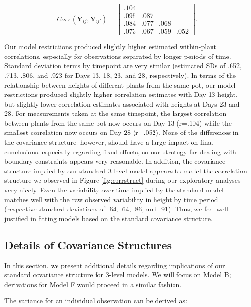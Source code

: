 \documentclass[
]{krantz}
\begin{document}
\[  Corr(\textbf{Y}_{ij},\textbf{Y}_{ij'}) = \left[
          \begin{array}{cccc}
            .104 & & & \\
            .095 & .087 & & \\
            .084 & .077 & .068 & \\
            .073 & .067 & .059 & .052
          \end{array} \right]. \]

Our model restrictions produced slightly higher estimated within-plant correlations, especially for observations separated by longer periods of time. Standard deviation terms by timepoint are very similar (estimated SDs of .652, .713, .806, and .923 for Days 13, 18, 23, and 28, respectively). In terms of the relationship between heights of different plants from the same pot, our model restrictions produced slightly higher correlation estimates with Day 13 height, but slightly lower correlation estimates associated with heights at Days 23 and 28. For measurements taken at the same timepoint, the largest correlation between plants from the same pot now occurs on Day 13 (r=.104) while the smallest correlation now occurs on Day 28 (r=.052). None of the differences in the covariance structure, however, should have a large impact on final conclusions, especially regarding fixed effects, so our strategy for dealing with boundary constraints appears very reasonable. In addition, the covariance structure implied by our standard 3-level model appears to model the correlation structure we observed in Figure \ref{fig:corrstruct} during our exploratory analyses very nicely. Even the variability over time implied by the standard model matches well with the raw observed variability in height by time period (respective standard deviations of .64, .64, .86, and .91). Thus, we feel well justified in fitting models based on the standard covariance structure.

\subsection{Details of Covariance Structures}\label{optionalerror}

In this section, we present additional details regarding implications of our standard covariance structure for 3-level models. We will focus on Model B; derivations for Model F would proceed in a similar fashion.

The variance for an individual observation can be derived as:
\end{document}
